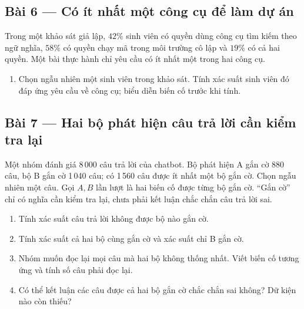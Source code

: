 \documentclass[11pt,a4paper]{article}
\begin{document}
\par\medskip

\noindent\begin{minipage}{\linewidth}
\subsection*{Bài 6 --- Có ít nhất một công cụ để làm dự án}

Trong một khảo sát giả lập, \(42\%\) sinh viên có quyền dùng công cụ tìm kiếm theo ngữ nghĩa, \(58\%\) có quyền chạy mã trong môi trường cô lập và \(19\%\) có cả hai quyền. Một bài thực hành chỉ yêu cầu có ít nhất một trong hai công cụ.

\begin{enumerate}[label=\alph*)]
\item Chọn ngẫu nhiên một sinh viên trong khảo sát. Tính xác suất sinh viên đó đáp ứng yêu cầu về công cụ; biểu diễn biến cố trước khi tính.
\end{enumerate}

\end{minipage}\par

\par\medskip

\noindent\begin{minipage}{\linewidth}
\subsection*{Bài 7 --- Hai bộ phát hiện câu trả lời cần kiểm tra lại}

Một nhóm đánh giá 8\,000 câu trả lời của chatbot. Bộ phát hiện A gắn cờ 880 câu, bộ B gắn cờ 1\,040 câu; có 1\,560 câu được ít nhất một bộ gắn cờ. Chọn ngẫu nhiên một câu. Gọi \(A,B\) lần lượt là hai biến cố được từng bộ gắn cờ. ``Gắn cờ'' chỉ có nghĩa cần kiểm tra lại, chưa phải kết luận chắc chắn câu trả lời sai.

\begin{enumerate}[label=\alph*)]
\item Tính xác suất câu trả lời không được bộ nào gắn cờ.
\item Tính xác suất cả hai bộ cùng gắn cờ và xác suất chỉ B gắn cờ.
\item Nhóm muốn đọc lại mọi câu mà hai bộ không thống nhất. Viết biến cố tương ứng và tính số câu phải đọc lại.
\item Có thể kết luận các câu được cả hai bộ gắn cờ chắc chắn sai không? Dữ kiện nào còn thiếu?
\end{enumerate}

\end{minipage}\par
\end{document}
